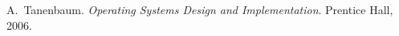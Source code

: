 
\begin{thebibliography}{1}


A.~Tanenbaum. \emph{Operating Systems Design and Implementation}.
Prentice Hall, 2006.


\end{thebibliography}
